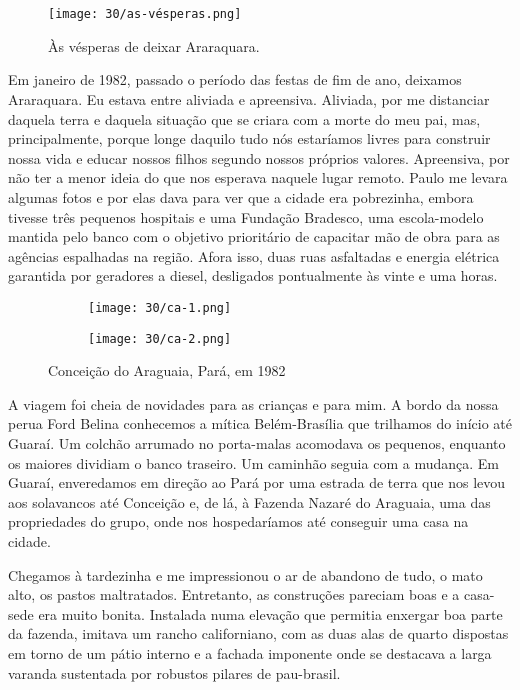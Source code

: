 \chapter{}

\begin{figure}
\centering
\texttt{[image: 30/as-vésperas.png]}
\caption{Às vésperas de deixar Araraquara.}
\end{figure}

Em janeiro de 1982, passado o período das festas de fim de ano, deixamos Araraquara.
Eu estava entre aliviada e apreensiva.
Aliviada, por me distanciar daquela terra e daquela situação que se criara com a morte do meu pai, mas, principalmente, porque longe daquilo tudo nós estaríamos livres para construir nossa vida e educar nossos filhos segundo nossos próprios valores.
Apreensiva, por não ter a menor ideia do que nos esperava naquele lugar remoto.
Paulo me levara algumas fotos e por elas dava para ver que a cidade era pobrezinha, embora tivesse três pequenos hospitais e uma Fundação Bradesco, uma escola-modelo mantida pelo banco com o objetivo prioritário de capacitar mão de obra para as agências espalhadas na região.
Afora isso, duas ruas asfaltadas e energia elétrica garantida por geradores a diesel, desligados pontualmente às vinte e uma horas.

\begin{figure}
\hfill
\centering
\begin{subfigure}[h]{0.48\linewidth}
\centering
\texttt{[image: 30/ca-1.png]}
\end{subfigure}
\hfill
\begin{subfigure}[h]{0.48\linewidth}
\centering
\texttt{[image: 30/ca-2.png]}
\end{subfigure}
\caption{Conceição do Araguaia, Pará, em 1982}
\end{figure}

A viagem foi cheia de novidades para as crianças e para mim.
A bordo da nossa perua Ford Belina conhecemos a mítica Belém-Brasília que trilhamos do início até Guaraí.
Um colchão arrumado no porta-malas acomodava os pequenos, enquanto os maiores dividiam o banco traseiro.
Um caminhão seguia com a mudança.
Em Guaraí, enveredamos em direção ao Pará por uma estrada de terra que nos levou aos solavancos até Conceição e, de lá, à Fazenda Nazaré do Araguaia, uma das propriedades do grupo, onde nos hospedaríamos até conseguir uma casa na cidade.

Chegamos à tardezinha e me impressionou o ar de abandono de tudo, o mato alto, os pastos maltratados.
Entretanto, as construções pareciam boas e a casa-sede era muito bonita.
Instalada numa elevação que permitia enxergar boa parte da fazenda, imitava um rancho californiano, com as duas alas de quarto dispostas em torno de um pátio interno e a fachada imponente onde se destacava a larga varanda sustentada por robustos pilares de pau-brasil.

